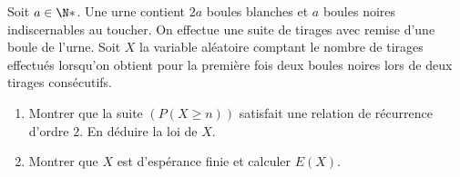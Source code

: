 \begin{enonce}
\begin{exercise}[ID={RMS126 E530},subtitle={Mines-Ponts PSI 2015},tags={}]
Soit $a\in\N*$.
Une urne contient $2a$ boules blanches et $a$ boules noires indiscernables au toucher.
On effectue une suite de tirages avec remise d'une boule de l'urne.
Soit $X$ la variable aléatoire comptant le nombre de tirages effectués lorsqu'on obtient pour la première fois deux boules noires lors de deux tirages consécutifs.
\begin{enumerate}
  \item Montrer que la suite $\left( P\left( X\geq n \right)  \right)$ satisfait une relation de récurrence d'ordre $2$.
    En déduire la loi de $X$.

  \item Montrer que $X$ est d'espérance finie et calculer $E(X)$.
\end{enumerate}
\end{exercise}
\begin{solution}
\end{solution}
\end{enonce}
